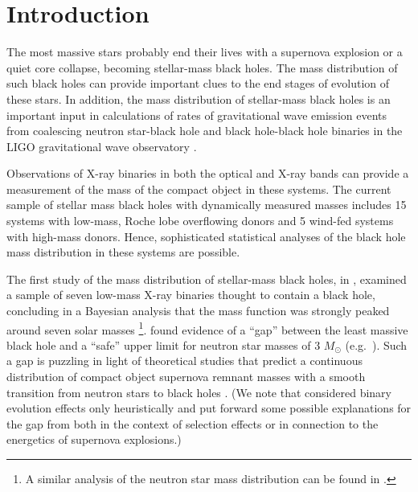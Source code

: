 \documentclass[preprint]{aastex}
\newcommand{\Msun}{M_\odot}
\begin{document}
\section{Introduction}
\label{sec:intro}

The most massive stars probably end their lives with a supernova
explosion or a quiet core collapse, becoming stellar-mass black holes.
The mass distribution of such black holes can provide important clues
to the end stages of evolution of these stars.  In addition, the mass
distribution of stellar-mass black holes is an important input in
calculations of rates of gravitational wave emission events from
coalescing neutron star-black hole and black hole-black hole binaries
in the LIGO gravitational wave observatory \citep{Abadie2010}.

Observations of X-ray binaries in both the optical and X-ray bands can
provide a measurement of the mass of the compact object in these
systems.  The current sample of stellar mass black holes with
dynamically measured masses includes 15 systems with low-mass, Roche
lobe overflowing donors and 5 wind-fed systems with high-mass
donors.  Hence, sophisticated statistical analyses of the black hole
mass distribution in these systems are possible.

The first study of the mass distribution of stellar-mass black holes,
in \citet{Bailyn1998}, examined a sample of seven low-mass X-ray
binaries thought to contain a black hole, concluding in a Bayesian
analysis that the mass function was strongly peaked around seven solar
masses%
\footnote{A similar analysis of the neutron star mass distribution can
  be found in \citet{Finn1994}.}. %
\citet{Bailyn1998} found evidence of a ``gap'' between the least
massive black hole and a ``safe'' upper limit for neutron star masses
of 3 $\Msun$ (e.g.\ \citet{Kalogera1996}).  Such a gap is puzzling in
light of theoretical studies that predict a continuous distribution of
compact object supernova remnant masses with a smooth transition from
neutron stars to black holes \citep{Fryer2001}.  (We note that
\citet{Fryer2001} considered binary evolution effects only
heuristically and put forward some possible explanations for the gap
from \citet{Bailyn1998} both in the context of selection effects or in
connection to the energetics of supernova explosions.)
\end{document}

